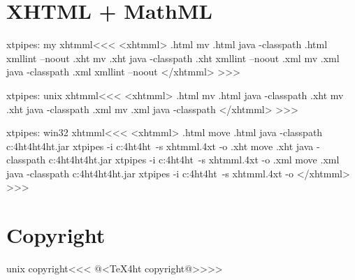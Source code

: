 \documentclass{article}
\begin{document}
\section{XHTML + MathML}

\<xtpipes: my xhtmml\><<<
<xhtmml>
.html mv %
.html java -classpath %
.html xmllint --noout %
.xht mv %
.xht java -classpath %
.xht xmllint --noout %
.xml mv %
.xml java -classpath %
.xml xmllint --noout %
</xhtmml>
>>>


\<xtpipes: unix xhtmml\><<<
<xhtmml>
.html mv %
.html java -classpath  %
.xht mv %
.xht java -classpath  %
.xml mv %
.xml java -classpath  %
</xhtmml>
>>>


\<xtpipes: win32 xhtmml\><<<
<xhtmml>
.html move %
.html java -classpath  c:\tex4ht\texmf\tex4ht\bin\tex4ht.jar xtpipes -i c:\tex4ht\texmf\tex4ht\xtpipes\ -s xhtmml.4xt -o %
.xht move %
.xht java -classpath  c:\tex4ht\texmf\tex4ht\bin\tex4ht.jar xtpipes -i c:\tex4ht\texmf\tex4ht\xtpipes\ -s xhtmml.4xt -o %
.xml move %
.xml java -classpath  c:\tex4ht\texmf\tex4ht\bin\tex4ht.jar xtpipes -i c:\tex4ht\texmf\tex4ht\xtpipes\ -s xhtmml.4xt -o %
</xhtmml>
>>>





\section{Copyright}




\<unix copyright\><<<
@<TeX4ht copyright@>>>>
\end{document}
